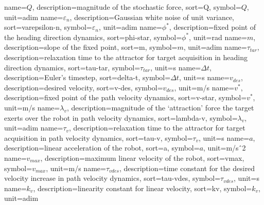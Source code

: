 %
{
  name={\ensuremath{Q}},
  description={magnitude of the stochastic force},
  sort=Q,
  symbol={\ensuremath{Q}},
  unit={adim}
}
%
{
  name={\ensuremath{\varepsilon_n}},
  description={Gaussian white noise of unit variance},
  sort=varepsilon-n,
  symbol={\ensuremath{\varepsilon_n}},
  unit={adim}
}
%
{
  name={\ensuremath{\phi^*}},
  description={fixed point of the heading direction dynamics},
  sort=phi-star,
  symbol={\ensuremath{\phi^*}},
  unit={\si{rad}}
}
%
{
  name={\ensuremath{m}},
  description={slope of the fixed point},
  sort=m,
  symbol={\ensuremath{m}},
  unit={adim}
}
%
{
  name={\ensuremath{\tau_{tar}}},
  description={relaxation time to the attractor for target acquisition in
    heading direction dynamics},
  sort=tau-tar,
  symbol={\ensuremath{\tau_{tar}}},
  unit={\si{s}}
}
%
{
  name={\ensuremath{\Delta t}},
  description={Euler's timestep},
  sort=delta-t,
  symbol={\ensuremath{\Delta t}},
  unit={\si{s}}
}
%
%
{
  name={\ensuremath{v_{des}}},
  description={desired velocity},
  sort=v-des,
  symbol={\ensuremath{v_{des}}},
  unit={\si{m/s}}
}
%
{
  name={\ensuremath{v^*}},
  description={fixed point of the path velocity dynamics},
  sort=v-star,
  symbol={\ensuremath{v^*}},
  unit={\si{m/s}}
}
%
{
  name={\ensuremath{\lambda_{v}}},
  description={magnitude of the `attraction' force the target exerts over the
    robot in path velocity dynamics},
  sort=lambda-v,
  symbol={\ensuremath{\lambda_{v}}},
  unit={adim}
}
%
{
  name={\ensuremath{\tau_{v}}},
  description={relaxation time to the attractor for target acquisition in
    path velocity dynamics},
  sort=tau-v,
  symbol={\ensuremath{\tau_{v}}},
  unit={\si{s}}
}
%
{
  name={\ensuremath{a}},
  description={linear acceleration of the robot},
  sort=a,
  symbol={\ensuremath{a}},
  unit={\si{m/sˆ2}}
}
%
{
  name={\ensuremath{v_{max}}},
  description={maximum linear velocity of the robot},
  sort=vmax,
  symbol={\ensuremath{v_{max}}},
  unit={\si{m/s}}
}
%
%
{
  name={\ensuremath{\tau_{vdes}}},
  description={time constant for the desired velocity increase in path velocity dynamics},
  sort=tau-vdes,
  symbol={\ensuremath{\tau_{vdes}}},
  unit={\si{s}}
}
%
{
  name={\ensuremath{k_{v}}},
  description={linearity constant for linear velocity},
  sort=kv,
  symbol={\ensuremath{k_{v}}},
  unit={adim}
}
